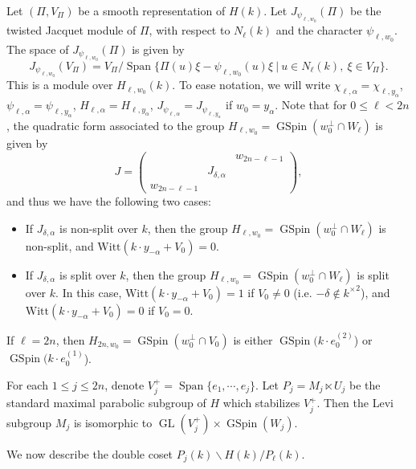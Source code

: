 \documentclass[12pt]{amsart}
\newcommand{\Span}{\operatorname{Span}}
\theoremstyle{remark}
\DeclareMathOperator{\GL}{GL}
\DeclareMathOperator{\GSpin}{GSpin}
\begin{document}
Let $(\Pi,V_\Pi)$ be a smooth representation of $H(k)$. Let $J_{\psi_{\ell,w_0}}(\Pi)$ be the twisted Jacquet module of $\Pi$, with respect to $N_{\ell}(k)$ and the character $\psi_{\ell, w_0}$. The space of $J_{\psi_{\ell,w_0}}(\Pi)$ is given by
\begin{equation*}
	J_{\psi_{\ell,w_0}}(V_\Pi)=V_\Pi/\Span\{\Pi(u)\xi-\psi_{\ell, w_0}(u)\xi\ |\ u\in N_\ell(k),\  \xi\in V_\Pi\}.
\end{equation*}
This is a module over $H_{\ell, w_0}(k)$. To ease notation, we will write $\chi_{\ell,\alpha}=\chi_{\ell,y_\alpha}$, $\psi_{\ell,\alpha}=\psi_{\ell,y_\alpha}$, $H_{\ell,\alpha}=H_{\ell,y_\alpha}$, $J_{\psi_{\ell,\alpha}}=J_{\psi_{\ell,y_\alpha}}$ if $w_0=y_\alpha$. Note that for $0\le \ell< 2n$, the quadratic form associated to the group $H_{\ell,w_0}=\GSpin(w_0^\perp\cap W_{\ell})$ is given by
$$J=\left(\begin{smallmatrix}
   &&w_{2n-\ell-1}\\&J_{\delta,\alpha}&\\w_{2n-\ell-1}&&
  \end{smallmatrix}\right),
$$
and thus we have the following two cases:
\begin{itemize}
\item If $J_{\delta, \alpha}$ is non-split over $k$, then the group 	$H_{\ell,w_0}=\GSpin(w_0^\perp\cap W_{\ell})$ is non-split, and  $\mathrm{Witt}(k\cdot y_{-\alpha}+V_0)=0$.
\item If $J_{\delta, \alpha}$ is split over $k$, then the group 	$H_{\ell,w_0}=\GSpin(w_0^\perp\cap W_{\ell})$ is split over $k$. In this case, $\mathrm{Witt}(k\cdot y_{-\alpha}+V_0)=1$ if $V_0\neq 0$ (i.e. $-\delta\notin {k^\times}^2$), and
 $\mathrm{Witt}(k\cdot y_{-\alpha}+V_0)=0$ if $V_0=0$.
\end{itemize}
If $\ell=2n$, then $H_{2n,w_0}=\GSpin(w_0^\perp \cap V_0)$ is either $\GSpin(k\cdot e_0^{(2)}$) or $\GSpin(k\cdot e_0^{(1)}$).

For each $1\le j \le 2n$, denote $V_j^+=\Span\{e_1, \cdots, e_j \}$. Let $P_j=M_{j}\ltimes U_{j}$ be the standard maximal parabolic subgroup of $H$ which stabilizes $V_{j}^+$. Then the Levi subgroup $M_{j}$ is isomorphic to $\GL(V_j^+) \times \GSpin(W_j)$. 

We now describe the double coset $P_j(k)\backslash H(k)/P_\ell(k)$.
\end{document}
